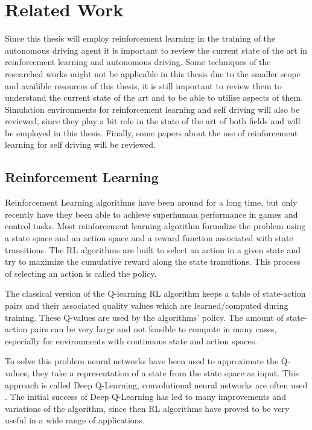 \chapter{Related Work}
\label{cha:Related Work}

Since this thesis will employ reinforcement learning in the training of the autonomous driving agent it is important to review the current state of the art in reinforcement learning and autonomous driving. Some techniques of the researched works might not be applicable in this thesis due to the smaller scope and availible resources of this thesis, it is still important to review them to understand the current state of the art and to be able to utilise aspects of them. Simulation environments for reinforcement learning and self driving will also be reviewed, since they play a bit role in the state of the art of both fields and will be employed in this thesis.
Finally, some papers about the use of reinforcement learning for self driving will be reviewed.


\section{Reinforcement Learning}

Reinforcement Learning algorithms have been around for a long time, but only recently have they been able to achieve superhuman performance in games and control tasks. Most reinforcement learning algorithm formalize the problem using a state space and an action space and a reward function associated with state transitions. The RL algorithms are built to select an action in a given state and try to maximize the cumulative reward along the state transitions. This process of selecting an action is called the policy.

The classical version of the Q-learning RL algorithm keeps a table of state-action pairs and their associated quality values which are learned/computed during training. These Q-values are used by the algorithms' policy. The amount of state-action pairs can be very large and not feasible to compute in many cases, especially for environments with continuous state and action spaces. %

To solve this problem neural networks have been used to approximate the Q-values, they take a representation of a state from the state space as input. This approach is called Deep Q-Learning, convolutional neural networks are often used \autocite{atari}. The initial success of Deep Q-Learning has led to many improvements and variations of the algorithm, since then RL algorithms have proved to be very useful in a wide range of applications.


